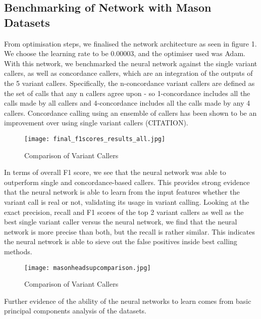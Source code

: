\documentclass{article}
\begin{document}
\subsection{Benchmarking of Network with Mason Datasets}
From optimisation steps, we finalised the network architecture as seen in figure 1. We choose the learning rate to be 0.00003, and the optimiser used was Adam. With this network, we benchmarked the neural network against the single variant callers, as well as concordance callers, which are an integration of the outputs of the 5 variant callers. Specifically, the n-concordance variant callers are defined as the set of calls that any n callers agree upon - so 1-concordance includes all the calls made by all callers and 4-concordance includes all the calls made by any 4 callers. Concordance calling using an ensemble of callers has been shown to be an improvement over using single variant callers (CITATION). 

\begin{figure}[H]
\texttt{[image: final\_f1scores\_results\_all.jpg]}
\caption{Comparison of Variant Callers}
\centering
\end{figure}

In terms of overall F1 score, we see that the neural network was able to outperform single and concordance-based callers. This provides strong evidence that the neural network is able to learn from the input features whether the variant call is real or not, validating its usage in variant calling. Looking at the exact precision, recall and F1 scores of the top 2 variant callers as well as the best single variant caller versus the neural network, we find that the neural network is more precise than both, but the recall is rather similar. This indicates the neural network is able to sieve out the false positives inside best calling methods. 

\begin{figure}[H]
\texttt{[image: masonheadsupcomparison.jpg]}
\caption{Comparison of Variant Callers}
\centering
\end{figure}

Further evidence of the ability of the neural networks to learn comes from basic principal components analysis of the datasets. 
\end{document}
